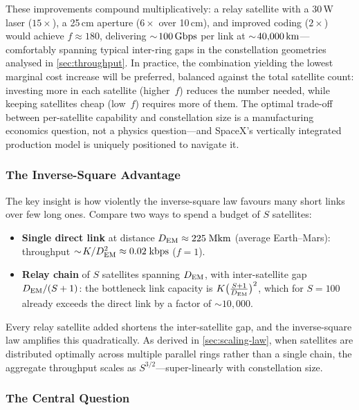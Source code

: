 These improvements compound multiplicatively: a relay satellite with a 30\,W
laser ($15\times$), a 25\,cm aperture ($6\times$ over 10\,cm), and improved
coding ($2\times$) would achieve $f \approx 180$, delivering
$\sim\!100\,\text{Gbps}$ per link at $\sim\!40{,}000\,\text{km}$---comfortably spanning typical
inter-ring gaps in the constellation geometries analysed in
\cref{sec:throughput}. In practice, the combination yielding the lowest marginal
cost increase will be preferred, balanced against the total satellite count:
investing more in each satellite (higher~$f$) reduces the number needed, while
keeping satellites cheap (low~$f$) requires more of them. The optimal trade-off
between per-satellite capability and constellation size is a manufacturing
economics question, not a physics question---and SpaceX's vertically integrated
production model is uniquely positioned to navigate it.

\subsubsection{The Inverse-Square Advantage}

The key insight is how violently the inverse-square law favours many short links
over few long ones. Compare two ways to spend a budget of $S$ satellites:

\begin{itemize}
  \item \textbf{Single direct link} at distance $D_{\mathrm{EM}} \approx 225\;\text{Mkm}$
    (average Earth--Mars): throughput $\sim\!K / D_{\mathrm{EM}}^2 \approx
    0.02\;\text{kbps}$ ($f = 1$).
  \item \textbf{Relay chain} of $S$ satellites spanning $D_{\mathrm{EM}}$, with inter-satellite
    gap $D_{\mathrm{EM}} / (S + 1)$: the bottleneck link capacity is
    $K \bigl(\frac{S+1}{D_{\mathrm{EM}}}\bigr)^{2}$, which for $S = 100$ already exceeds
    the direct link by a factor of $\sim\!10{,}000$.
\end{itemize}

Every relay satellite added shortens the inter-satellite gap, and the
inverse-square law amplifies this quadratically. As derived in
\cref{sec:scaling-law}, when satellites are distributed optimally across
multiple parallel rings rather than a single chain, the aggregate throughput
scales as $S^{3/2}$---super-linearly with constellation size.

\subsubsection{The Central Question}

